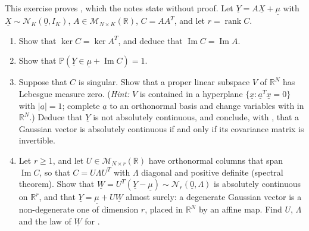 \begin{exercise}\label{ex:gv-degenerate}
\medium This exercise proves , which the notes state without proof. Let
$\underline Y=A\underline X+\underline\mu$ with $\underline X\sim\mathcal N_K(\underline 0,I_K)$,
$A\in\mathcal M_{N\times K}(\mathbb R)$, $C=AA^T$, and let $r=\operatorname{rank}C$.
\begin{enumerate}[label=(\alph*)]
  \item Show that $\ker C=\ker A^T$, and deduce that $\operatorname{Im}C=\operatorname{Im}A$.
  \item Show that $\mathbb P(\underline Y\in\underline\mu+\operatorname{Im}C)=1$.
  \item Suppose that $C$ is singular. Show that a proper linear subspace $V$ of $\mathbb R^N$ has
    Lebesgue measure zero. (\emph{Hint:} $V$ is contained in a hyperplane
    $\{\underline x:\underline a^T\underline x=0\}$ with $|\underline a|=1$; complete $\underline a$
    to an orthonormal basis and change variables with  in $\mathbb R^N$.)
    Deduce that $\underline Y$ is not absolutely continuous, and conclude, with
    , that a Gaussian vector is absolutely continuous if and only if its
    covariance matrix is invertible.
  \item Let $r\ge1$, and let $U\in\mathcal M_{N\times r}(\mathbb R)$ have orthonormal columns that
    span $\operatorname{Im}C$, so that $C=U\Lambda U^T$ with $\Lambda$ diagonal and positive definite
    (spectral theorem). Show that $\underline W=U^T(\underline Y-\underline\mu)\sim\mathcal N_r(\underline 0,\Lambda)$
    is absolutely continuous on $\mathbb R^r$, and that $\underline Y=\underline\mu+U\underline W$
    almost surely: a degenerate Gaussian vector is a non-degenerate one of dimension $r$, placed in
    $\mathbb R^N$ by an affine map. Find $U$, $\Lambda$ and the law of $\underline W$ for
    .
\end{enumerate}
\end{exercise}

